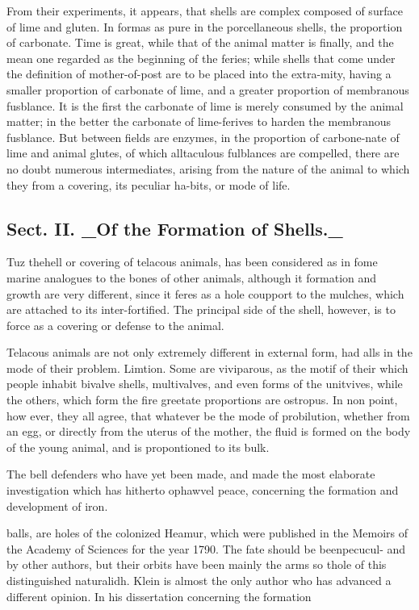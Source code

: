 From their experiments, it appears, that shells are complex composed of surface of lime and gluten. In formas as pure in the porcellaneous shells, the proportion of carbonate. Time is great, while that of the animal matter is finally, and the mean one regarded as the beginning of the feries; while shells that come under the definition of mother-of-post are to be placed into the extra-mity, having a smaller proportion of carbonate of lime, and a greater proportion of membranous fusblance. It is the first the carbonate of lime is merely consumed by the animal matter; in the better the carbonate of lime-ferives to harden the membranous fusblance. But between fields are enzymes, in the proportion of carbone-nate of lime and animal glutes, of which alltaculous fulblances are compelled, there are no doubt numerous intermediates, arising from the nature of the animal to which they from a covering, its peculiar ha-bits, or mode of life.\par\medskip
\subsection*{Sect. II. \_Of the Formation of Shells.\_}
Tuz thehell or covering of telacous animals, has been considered as in fome marine analogues to the bones of other animals, although it formation and growth are very different, since it feres as a hole coupport to the mulches, which are attached to its inter-fortified. The principal side of the shell, however, is to force as a covering or defense to the animal.\par\medskip
Telacous animals are not only extremely different in external form, had alls in the mode of their problem. Limtion. Some are viviparous, as the motif of their which people inhabit bivalve shells, multivalves, and even forms of the unitvives, while the others, which form the fire greetate proportions are ostropus. In non point, how ever, they all agree, that whatever be the mode of probilution, whether from an egg, or directly from the uterus of the mother, the fluid is formed on the body of the young animal, and is propontioned to its bulk.\par\medskip
The bell defenders who have yet been made, and made the most elaborate investigation which has hitherto ophawvel peace, concerning the formation and development of iron.\par\medskip
balls, are holes of the colonized Heamur, which were published in the Memoirs of the Academy of Sciences for the year 1790. The fate should be beenpecucul- and by other authors, but their orbits have been mainly the arms so thole of this distinguished naturalidh. Klein is almost the only author who has advanced a different opinion. In his dissertation concerning the formation\par\medskip

